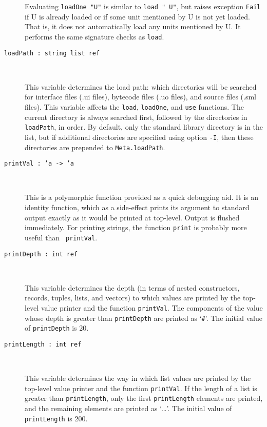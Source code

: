 \documentclass[fleqn]{article}
\begin{document}
\begin{description}
  Evaluating {\tt loadOne "{\rm U}"} is similar to {\tt load "{\rm
      U}"}, but raises exception {\tt Fail} if U is already loaded or
  if some unit mentioned by U is not yet loaded.  That is, it does not
  automatically load any units mentioned by U.  It performs the same
  signature checks as {\tt load}.

\item[{\tt loadPath :\ string list ref}]\mbox{ }

  This variable determines the load path: which directories will be
  searched for interface files (.ui files), bytecode files (.uo
  files), and source files (.sml files).  This variable affects the
  {\tt load}, {\tt loadOne}, and {\tt use} functions.  The current
  directory is always searched first, followed by the directories in
  {\tt loadPath}, in order.  By default, only the standard library
  directory is in the list, but if additional directories are
  specified using option {\tt -I}, then these directories are
  prepended to {\tt Meta.loadPath}.

\item[{\tt printVal :\ 'a -> 'a}]\mbox{ }

  This is a polymorphic function provided as a quick debugging aid.
  It is an identity function, which as a side-effect prints its
  argument to standard output exactly as it would be printed at
  top-level.  Output is flushed immediately.  For printing strings,
  the function {\tt print} is probably more useful than {\tt
    printVal}.

\item[{\tt printDepth :\ int ref}]\mbox{ }

  This variable determines the depth (in terms of nested constructors,
  records, tuples, lists, and vectors) to which values are printed by
  the top-level value printer and the function {\tt printVal}. The
  components of the value whose depth is greater than {\tt printDepth}
  are printed as `{\tt \#}'.  The initial value of {\tt printDepth} is
  20. 

\item[{\tt printLength :\ int ref}]\mbox{ }

  This variable determines the way in which list values are printed by
  the top-level value printer and the function {\tt printVal}. If the
  length of a list is greater than {\tt printLength}, only the first
  {\tt printLength} elements are printed, and the remaining elements
  are printed as `\ldots'.  The initial value of {\tt printLength} is
  200.


\end{description}
\end{document}
